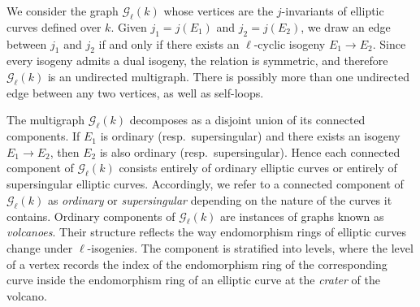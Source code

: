 \documentclass[table]{amsart}
\numberwithin{equation}{section}
\begin{document}
\par
We consider the graph $\mathcal{G}_\ell(k)$ whose vertices are the $j$-invariants of elliptic curves defined over $k$. Given $j_1=j(E_1)$ and $j_2=j(E_2)$, we draw an edge between $j_1$ and $j_2$ if and only if there exists an $\ell$-cyclic isogeny $E_1\!\to\!E_2$. Since every isogeny admits a dual isogeny, the relation is symmetric, and therefore $\mathcal{G}_\ell(k)$ is an undirected multigraph. There is possibly more than one undirected edge between any two vertices, as well as self-loops.
\par The multigraph $\mathcal{G}_\ell(k)$ decomposes as a disjoint union of its connected components. If $E_1$ is ordinary (resp.\ supersingular) and there exists an isogeny $E_1\to E_2$, then $E_2$ is also ordinary (resp.\ supersingular). Hence each connected component of $\mathcal{G}_\ell(k)$ consists entirely of ordinary elliptic curves or entirely of supersingular elliptic curves. Accordingly, we refer to a connected component of $\mathcal{G}_\ell(k)$ as \emph{ordinary} or \emph{supersingular} depending on the nature of the curves it contains. Ordinary components of $\mathcal{G}_\ell(k)$ are instances of graphs known as \emph{volcanoes}. Their structure reflects the way endomorphism rings of elliptic curves change under $\ell$-isogenies. The component is stratified into levels, where the level of a vertex records the index of the endomorphism ring of the corresponding curve inside the endomorphism ring of an elliptic curve at the \emph{crater} of the volcano.
\end{document}
